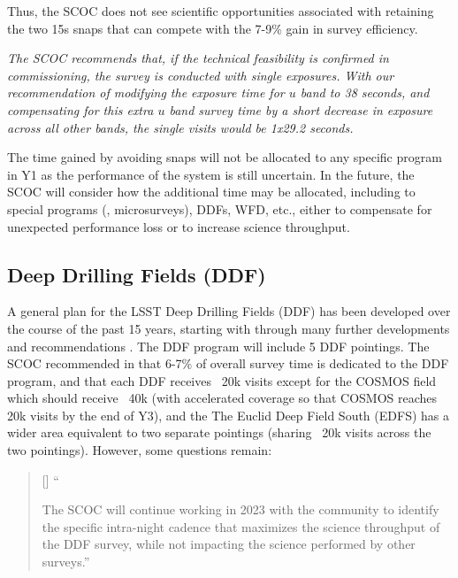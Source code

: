 Thus, the SCOC does not see scientific opportunities associated with retaining the two 15s snaps that can compete with the 7-9\% gain in survey efficiency.

\emph{The SCOC recommends that, if the technical feasibility is confirmed in commissioning, the survey is conducted with single exposures. With our recommendation of modifying the exposure time for $u$ band to 38 seconds, and compensating for this extra $u$ band survey time by a short decrease in exposure across all other bands, the single visits would be 1x29.2 seconds.}

The time gained by avoiding snaps will not be allocated to any specific program in Y1 as the performance of the system is still uncertain. In the future, the SCOC will consider how the additional time may be allocated, including to special programs (\eg, microsurveys), DDFs, WFD, etc., either to compensate for unexpected performance loss or to increase science throughput.

\subsection{Deep Drilling Fields (DDF)}\label{sec:DDF}

A general plan for the LSST Deep Drilling Fields (DDF) has been developed over the course of the past 15 years, starting with \cite{2009arXiv0912.0201L} through many further developments and recommendations \citep[\eg ,][]{Brandt:2018,Scolnic:2018}.
The DDF program will include
5 DDF pointings. The SCOC recommended in  that  
6-7\% of overall survey time is dedicated to the DDF program, and that each DDF receives ~20k visits
except for the COSMOS field which should receive ~40k (with accelerated coverage so that COSMOS reaches 20k visits by the end of Y3), and the 
The Euclid Deep Field South (EDFS) has a wider area equivalent to two separate pointings (sharing ~20k visits across the two pointings). However, some questions remain: 
\begin{quote}
    [] ``\item The SCOC will continue working in 2023 with the community to identify the specific intra-night cadence that maximizes the science throughput of the DDF survey, while not impacting the science performed by other surveys.''
\end{quote}


